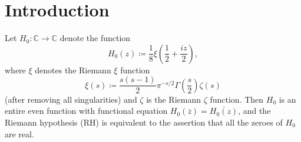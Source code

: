 \documentclass[a4paper,11pt,twoside]{amsart}
\newcommand\R{\mathbb{R}}
\newcommand\C{\mathbb{C}}
\begin{document}

\author{D.H.J. Polymath}
\address{\tt{http://michaelnielsen.org/polymath1/index.php}}


\begin{abstract}
For each $t \in \R$, define the entire function
$$ H_t(z) \coloneqq \int_0^\infty e^{tu^2} \Phi(u) \cos(zu)\ du$$
where $\Phi$ is the super-exponentially decaying function
$$ \Phi(u) \coloneqq \sum_{n=1}^\infty (2\pi^2  n^4 e^{9u} - 3\pi n^2 e^{5u} ) \exp(-\pi n^2 e^{4u} ).$$
This is essentially the heat flow evolution of the Riemann $\xi$ function.
From the work of de Bruijn and Newman, there exists a finite constant $\Lambda$ (the \emph{de Bruijn-Newman constant}) such that the zeroes of $H_t$ are all real precisely when $t \geq \Lambda$.  The Riemann hypothesis is equivalent to the assertion $\Lambda \leq 0$; recently, Rodgers and Tao established the matching lower bound $\Lambda \geq 0$.  Ki, Kim and Lee established the upper bound $\Lambda < \frac{1}{2}$.

In this paper we establish several effective estimates on $H_t(x+iy)$ for $t \geq 0$, including some that are accurate for small or medium values of $x$.  By combining these estimates with numerical computations, we are able to obtain a new upper bound $\Lambda \leq 0.22$ unconditionally, as well as improvements conditional on further numerical verification of the Riemann hypothesis.  We also obtain some new estimates controlling the asymptotic behavior of zeroes of $H_t(x+iy)$ as $x \to \infty$.
\end{abstract}


\maketitle

\section{Introduction}

Let $H_0 \colon \C \to \C$ denote the function
\begin{equation}\label{hoz}
 H_0(z) \coloneqq \frac{1}{8} \xi\left(\frac{1}{2} + \frac{iz}{2}\right),
\end{equation}
where $\xi$ denotes the Riemann $\xi$ function
\begin{equation}\label{sas}
 \xi(s) \coloneqq \frac{s(s-1)}{2} \pi^{-s/2} \Gamma\left(\frac{s}{2}\right) \zeta(s)
\end{equation}
(after removing all singularities) and $\zeta$ is the Riemann $\zeta$ function.
Then $H_0$ is an entire even function with functional equation $H_0(\overline{z}) = \overline{H_0(z)}$, and the Riemann hypothesis (RH) is equivalent to the assertion that all the zeroes of $H_0$ are real.
\end{document}
